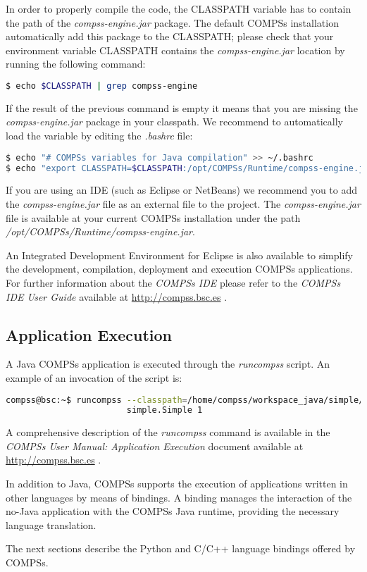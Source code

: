 In order to properly compile the code, the CLASSPATH variable has to contain the path of the \textit{compss-engine.jar} package. The default COMPSs
installation automatically add this package to the CLASSPATH; please check that your environment variable CLASSPATH contains the \textit{compss-engine.jar} location by running the following command:
\begin{lstlisting}[language=bash]
$ echo $CLASSPATH | grep compss-engine
\end{lstlisting}
If the result of the previous command is empty it means that you are missing the \textit{compss-engine.jar} package in your classpath. 
We recommend to automatically load the variable by editing the \textit{.bashrc} file:
\begin{lstlisting}[language=bash]
$ echo "# COMPSs variables for Java compilation" >> ~/.bashrc
$ echo "export CLASSPATH=$CLASSPATH:/opt/COMPSs/Runtime/compss-engine.jar" >> ~/.bashrc
\end{lstlisting}

If you are using an IDE (such as Eclipse or NetBeans) we recommend you to add the \textit{compss-engine.jar} file as an external file 
to the project. The \textit{compss-engine.jar} file is available at your current COMPSs installation under the path \textit{/opt/COMPSs/Runtime/compss-engine.jar}.


An Integrated Development Environment for Eclipse is also available to simplify the development, compilation,
deployment and execution COMPSs applications. For further information about the \textit{COMPSs IDE} please refer to the \textit{COMPSs IDE
User Guide} available at \url{http://compss.bsc.es} .


\subsection{Application Execution}
A Java COMPSs application is executed through the \textit{runcompss} script. An example of an invocation of the script is:

\begin{lstlisting}[language=bash]
compss@bsc:~$ runcompss --classpath=/home/compss/workspace_java/simple/jar/simple.jar 
                        simple.Simple 1
\end{lstlisting}

A comprehensive description of the \textit{runcompss} command is available in the \textit{COMPSs User Manual: Application
Execution} document available at \url{http://compss.bsc.es} . 
\newline
~ \newline

In addition to Java, COMPSs supports the execution of applications written in other languages by 
means of bindings. A binding manages the interaction of the no-Java application with the COMPSs 
Java runtime, providing the necessary language translation.

The next sections describe the Python and C/C++ language bindings offered by COMPSs.
